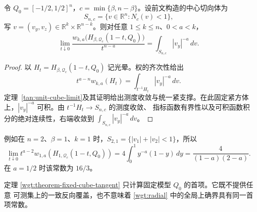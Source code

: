 \begin{theorem}[固定方体的加权切向首项]\label{wgt:theorem-fixed-cube-tangent}
令 \(Q_0=[-1/2,1/2]^n\)，\(c=\min\{\beta,n-\beta\}\)。设前文构造的中心切向体为
\[
 S_{n,c}=\{v\in\mathbb R^n:N_c(v)<1\},
\]
写 \(v=(v_y,v_z)\in\mathbb R^k\times\mathbb R^{n-k}\)。则对任意 \(1\leq k\leq n\)、\(0<a<k\)，
\begin{equation}
 \lim_{t\downarrow0}
 \frac{w_{k,a}\bigl(H_{\beta,\mathcal Q_c}(1-t,Q_0)\bigr)}{t^{n-a}}
 =\int_{S_{n,c}}|v_y|^{-a}\,dv.
\label{wgt:fixed-cube-tangent}
\end{equation}
\end{theorem}

\begin{proof}
以 \(H_t=H_{\beta,\mathcal Q_c}(1-t,Q_0)\) 记光晕。权的齐次性给出
\[
 t^{a-n}w_{k,a}(H_t)=\int_{t^{-1}H_t}|v_y|^{-a}\,dv.
\]
定理~\ref{tan:unit-cube-limit}及其证明给出测度收敛与统一紧支撑。在此固定紧方体上，\(|v_y|^{-a}\) 可积。由 \(t^{-1}H_t\to S_{n,c}\) 的测度收敛、
指标函数有界性以及可积函数积分的绝对连续性，右端收敛到
\(\int_{S_{n,c}}|v_y|^{-a}\,dv\)。
\end{proof}

例如在 $n=2$、$\beta=1$、$k=1$ 时，$S_{2,1}=\{|v_1|+|v_2|<1\}$，所以
\[
 \lim_{t\downarrow0}t^{a-2}w_{1,a}(H_{1,\mathcal Q_c}(1-t,Q_0))
 =4\int_0^1 y^{-a}(1-y)\,dy=\frac4{(1-a)(2-a)}.
\]
在 $a=1/2$ 时该常数为 $16/3$。

\begin{remark}\label{wgt:remark-scope}
定理 \ref{wgt:theorem-fixed-cube-tangent} 只计算固定模型 \(Q_0\) 的首项。它既不提供任意
可测集上的一致反向覆盖，也不意味着 \eqref{wgt:radial} 中的全局上确界具有同一首项常数。
\end{remark}
